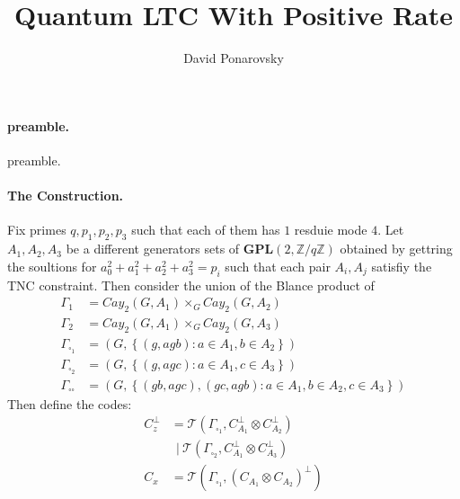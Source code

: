 \documentclass{article}
\begin{document}
\title{Quantum LTC With Positive Rate}
\author{David Ponarovsky}
\maketitle
\begin{multicols*}{2}


  \paragraph{preamble.} preamble.  
  \paragraph{The Construction.} Fix primes $q,p_1,p_2,p_3$ such that each of them has $1 $ resduie mode $4$. Let $A_{1},A_{2},A_{3}$ be a different generators sets of $ \mathbf{GPL}(2 , \mathbb{Z} / q\mathbb{Z} )  $ 
  obtained by gettring the soultions for $a_{0}^{2} + a_{1}^{2} +a_{2}^{2} +a_{3}^{2} = p_i $ such that each pair $A_i,A_j$ satisfiy the 
  TNC constraint. Then consider the union of the Blance product of 
  \begin{equation*}
    \begin{split}
      \Gamma_{1}  &= Cay_{2}\left(  G, A_{1} \right)\times_{G} Cay_{2}\left(  G, A_{2} \right) \\
      \Gamma_{2}  &= Cay_{2}\left(  G, A_{1} \right)\times_{G} Cay_{2}\left(  G, A_{3} \right) \\
      \Gamma_{\square_{1}} &= \left( G, \left\{ \left( g, agb \right) : a \in A_{1}, b \in A_{2} \right\}  \right) \\
      \Gamma_{\square_{2}} &= \left( G, \left\{ \left( g, agc \right) : a \in A_{1}, c \in A_{3} \right\}  \right) \\
      \Gamma_{\square \square} &= \left( G, \left\{ \left( gb, agc \right), \left( gc, agb \right) :
      a \in A_{1}, b \in A_{2}, c \in A_{3} \right\}  \right) 
    \end{split}
  \end{equation*}
   Then define the codes:
	\begin{equation*}
	  \begin{split}
	    C_{z}^{\perp} & = \mathcal{T}\left( \Gamma_{\square_{1}}, C_{A_1}^{\perp} \otimes  C_{A_2}^{\perp}  \right) \\
	    & \ \ | \ \mathcal{T}\left(  \Gamma_{\square_{2}}, C_{A_1}^{\perp} \otimes C_{A_3}^{\perp}  \right) \\
	    C_{x} &=  \mathcal{T}\left(  \Gamma_{\square_{1}}, \left(  C_{A_1} \otimes C_{A_2} \right)^{\perp}  \right) \\

\end{split}
\end{equation*}
\end{multicols*}
\end{document}
